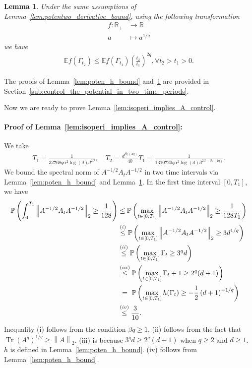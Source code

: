 \documentclass[11pt,twoside]{article}
\newcommand{\co}{A}
\newcommand{\potentwo}{\Gamma}
\theoremstyle{named}
\theoremstyle{plain}
\newtheorem{lemma}{Lemma}
\newcommand{\vecnorm}[2]{\left\| #1\right\|_{#2}}
\newcommand{\Exs}{\ensuremath{{\mathbb{E}}}}
\newcommand{\Prob}{\ensuremath{{\mathbb{P}}}}
\newcommand{\usedim}{\ensuremath{d}}
\newcommand{\dims}{\usedim}
\DeclareMathOperator{\trace}{Tr}
\newcommand{\real}{\ensuremath{\mathbb{R}}}
\newcommand{\parenth}[1]{\left( #1 \right)}
\begin{document}
\begin{lemma}
  \label{lem:poten_f_bound}
  Under the same assumptions of Lemma~\ref{lem:potentwo_derivative_bound}, using the following transformation
  \begin{align*}
    f: \real_+ &\rightarrow \real \\
    a &\mapsto a^{1/q}
  \end{align*}
  we have
  \begin{align*}
    \Exs f(\potentwo_{t_2}) \leq \Exs f(\potentwo_{t_1}) \parenth{\frac{t_2}{t_1}}^{2q}, \forall t_2 > t_1 > 0.
  \end{align*}
\end{lemma}
The proofs of Lemma~\ref{lem:poten_h_bound} and~\ref{lem:poten_f_bound} are provided in Section~\ref{sub:control_the_potential_in_two_time_periods}.

Now we are ready to prove Lemma~\ref{lem:isoperi_implies_A_control}.
\paragraph{Proof of Lemma~\ref{lem:isoperi_implies_A_control}:} We take
\begin{align*}
  T_1 = \frac{1}{32768 q \alpha^2 \log(\dims) \dims^{2\beta}}, \quad T_2 = \frac{\dims^{\beta/(4q)}}{40} T_1 = \frac{1}{ 1310720 q \alpha^2\log(\dims) \dims^{2\beta - \beta/(4q)}}.
\end{align*}
We bound the spectral norm of $\co^{-1/2}A_t \co^{-1/2}$ in two time intervals via Lemma~\ref{lem:poten_h_bound} and Lemma~\ref{lem:poten_f_bound}.
In the first time interval $[0, T_1]$, we have
\begin{align}
  \label{eq:spec_norm_first_time_period}
  \Prob\parenth{\int_0^{T_1} \vecnorm{\co^{-1/2}A_t \co^{-1/2}}{2} \geq \frac{1}{128}} &\leq \Prob\parenth{\max_{t \in [0, T_1]} \vecnorm{\co^{-1/2}A_t \co^{-1/2}}{2} \geq \frac{1}{128T_1}} \notag \\
  &\stackrel{(i)}{\leq} \Prob\parenth{\max_{t \in [0, T_1]} \vecnorm{\co^{-1/2}A_t \co^{-1/2}}{2} \geq 3 \dims^{1/q}} \notag \\
  &\stackrel{(ii)}{\leq} \Prob\parenth{\max_{t \in [0, T_1]} \potentwo_t \geq 3^{q} \dims} \notag \\
  &\stackrel{(iii)}{\leq} \Prob\parenth{\max_{t \in [0, T_1]} \potentwo_t + 1 \geq 2^{q} (\dims+1)} \notag \\
  &\stackrel{\phantom{(iii)}}{=} \Prob\parenth{\max_{t \in [0, T_1]} h(\potentwo_t) \geq -\frac{1}{2} \parenth{\dims+1}^{-1/q}} \notag \\
  &\stackrel{(iv)}{\leq} \frac{3}{10}.
\end{align}
Inequality (i) follows from the condition $\beta q \geq 1$. (ii) follows from the fact that $\trace\parenth{A^q}^{1/q} \geq \vecnorm{A}{2}$. (iii) is because $3^q \dims \geq 2^q (\dims + 1)$ when $q \geq 2$ and $\dims \geq 1$. $h$ is defined in Lemma~\ref{lem:poten_h_bound}. (iv) follows from Lemma~\ref{lem:poten_h_bound}.
\end{document}
